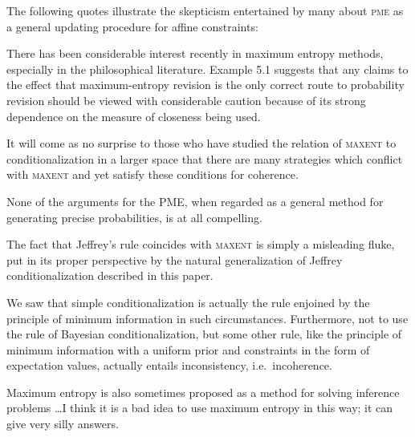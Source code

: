 \documentclass[phd,12pt,oneside]{ubcthesis}
\begin{document}
The following quotes illustrate the skepticism entertained by many
about \textsc{pme} as a general updating procedure for affine
constraints:

\begin{quotex}
  There has been considerable interest recently in maximum entropy
  methods, especially in the philosophical literature. Example 5.1
  suggests that any claims to the effect that maximum-entropy revision
  is the only correct route to probability revision should be viewed
  with considerable caution because of its strong dependence on the
  measure of closeness being used. 
\end{quotex}

\begin{quotex}
  It will come as no surprise to those who have studied the relation
  of \textsc{maxent} to conditionalization in a larger space that
  there are many strategies which conflict with \textsc{maxent} and
  yet satisfy these conditions for coherence. 
\end{quotex}

\begin{quotex}
  None of the arguments for the PME, when regarded as a general method
  for generating precise probabilities, is at all compelling.
\end{quotex}

\begin{quotex}
  The fact that Jeffrey's rule coincides with \textsc{maxent} is
  simply a misleading fluke, put in its proper perspective by the
  natural generalization of Jeffrey conditionalization described in
  this paper. 
\end{quotex}

\begin{quotex}
  We saw that simple conditionalization is actually the rule enjoined
  by the principle of minimum information in such circumstances.
  Furthermore, not to use the rule of Bayesian conditionalization, but
  some other rule, like the principle of minimum information with a
  uniform prior and constraints in the form of expectation values,
  actually entails inconsistency, i.e.\ incoherence.
\end{quotex}

\begin{quotex}
  Maximum entropy is also sometimes proposed as a method for solving
  inference problems \ldots I think it is a bad idea to use maximum
  entropy in this way; it can give very silly answers.
\end{quotex}
\end{document}
